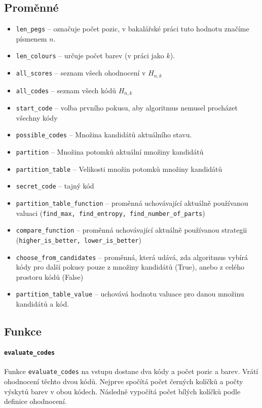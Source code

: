 \documentclass[12pt,a4paper]{article}
\begin{document}
\subsection{Proměnné}
\begin{itemize}
    \item \texttt{len\_pegs} -- označuje počet pozic, v bakalářské práci tuto hodnotu značíme písmenem $n$.
    \item \texttt{len\_colours} -- určuje počet barev (v práci jako $k$).
    \item \texttt{all\_scores} -- seznam všech ohodnocení v $H_{n,k}$
    \item \texttt{all\_codes} -- seznam všech kódů $H_{n,k}$
    \item \texttt{start\_code} -- volba prvního pokusu, aby algoritmus nemusel procházet všechny kódy
    \item \texttt{possible\_codes} -- Množina kandidátů aktuálního stavu.
    \item \texttt{partition} -- Množina potomků aktuální množiny kandidátů
    \item \texttt{partition\_table} -- Velikosti množin potomků množiny kandidátů
    \item \texttt{secret\_code} -- tajný kód
    \item \texttt{partition\_table\_function} -- proměnná uchovávající aktuálně používanou valuaci (\texttt{find\_max, find\_entropy, find\_number\_of\_parts})
    \item \texttt{compare\_function} -- proměnná uchovávající aktuálně používanou strategii (\texttt{higher\_is\_better, lower\_is\_better})
    \item \texttt{choose\_from\_candidates} -- proměnná, která udává, zda algoritmus vybírá kódy pro další pokusy pouze z množiny kandidátů (True), anebo z celého prostoru kódů (False)
    \item \texttt{partition\_table\_value} -- uchovává hodnotu valuace pro danou množinu kandidátů a kód.
\end{itemize}



\subsection{Funkce}

\paragraph{\texttt{evaluate\_codes}}
Funkce \texttt{evaluate\_codes} na vstupu dostane dva kódy a počet pozic a barev. Vrátí ohodnocení těchto dvou kódů. Nejprve spočítá počet černých kolíčků a počty výskytů barev v obou kódech. Následně vypočítá počet bílých kolíčků podle definice ohodnocení. 
\end{document}
